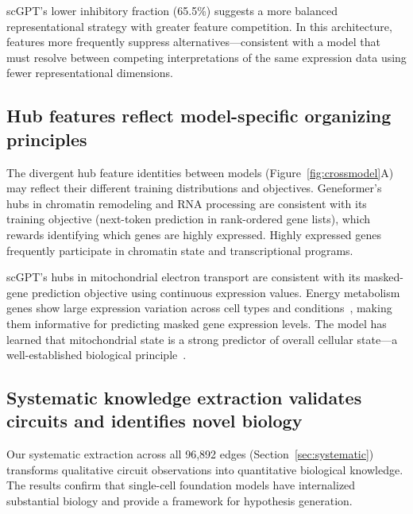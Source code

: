 \documentclass[onecolumn]{article}
\begin{document}
scGPT's lower inhibitory fraction (65.5\%) suggests a more balanced representational strategy with greater feature competition. In this architecture, features more frequently suppress alternatives---consistent with a model that must resolve between competing interpretations of the same expression data using fewer representational dimensions.

\subsection{Hub features reflect model-specific organizing principles}

The divergent hub feature identities between models (Figure~\ref{fig:crossmodel}A) may reflect their different training distributions and objectives. Geneformer's hubs in chromatin remodeling and RNA processing are consistent with its training objective (next-token prediction in rank-ordered gene lists), which rewards identifying which genes are highly expressed. Highly expressed genes frequently participate in chromatin state and transcriptional programs.

scGPT's hubs in mitochondrial electron transport are consistent with its masked-gene prediction objective using continuous expression values. Energy metabolism genes show large expression variation across cell types and conditions~\citep{chandel2021mitochondria}, making them informative for predicting masked gene expression levels. The model has learned that mitochondrial state is a strong predictor of overall cellular state---a well-established biological principle~\citep{tabula2022tabula,chandel2021mitochondria}.


\subsection{Systematic knowledge extraction validates circuits and identifies novel biology}
\label{sec:knowledge}

Our systematic extraction across all 96,892 edges (Section~\ref{sec:systematic}) transforms qualitative circuit observations into quantitative biological knowledge. The results confirm that single-cell foundation models have internalized substantial biology and provide a framework for hypothesis generation.
\end{document}
